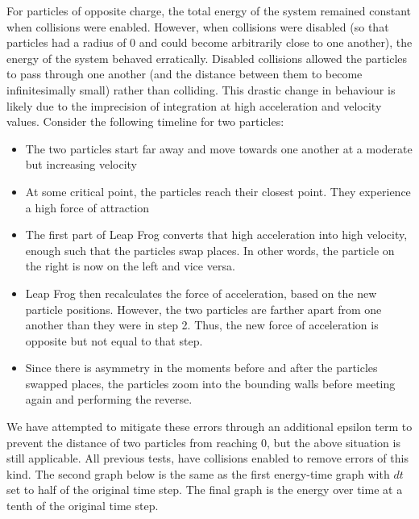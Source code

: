 \documentclass{article}
\begin{document}
For particles of opposite charge, the total energy of the system remained constant when collisions were enabled.
However, when collisions were disabled (so that particles had a radius of 0 and could become arbitrarily close to one another),
the energy of the system behaved erratically.
Disabled collisions allowed
the particles to pass through one another (and the distance between them to become infinitesimally small) rather than colliding.
This drastic change in behaviour is likely due to the imprecision of integration at high acceleration and velocity values.
Consider the following timeline for two particles:
\begin{itemize}
    \item The two particles start far away and move towards one another at a moderate but increasing velocity
    \item At some critical point, the particles reach their closest point. They experience a high force of attraction
    \item The first part of Leap Frog converts that high acceleration into high velocity, enough such that the particles swap places.
    In other words, the particle on the right is now on the left and vice versa.
    \item Leap Frog then recalculates the force of acceleration, based on the new particle positions.
    However, the two particles are farther apart from one another than they were in step 2.
    Thus, the new force of acceleration is opposite but not equal to that step.
    \item Since there is asymmetry in the moments before and after the particles swapped places,
    the particles zoom into the bounding walls before meeting again and performing the reverse.
\end{itemize}
We have attempted to mitigate these errors through an additional epsilon term to prevent the distance of two particles from reaching 0,
but the above situation is still applicable.
All previous tests, have collisions enabled to remove errors of this kind.
The second graph below is the same as the first energy-time graph with $dt$ set to half of the original time step.
The final graph is the energy over time at a tenth of the original time step.
\\
\end{document}
